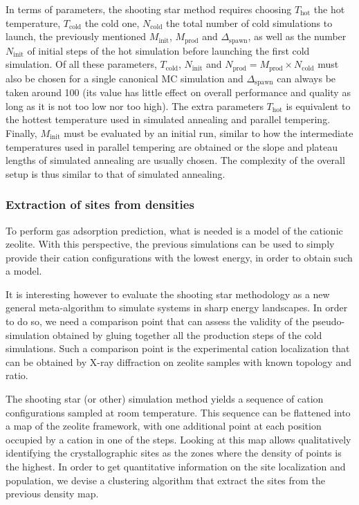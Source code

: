 \documentclass[main.tex]{subfiles}
\begin{document}
In terms of parameters, the shooting star method requires choosing $T_\text{hot}$ the hot temperature, $T_\text{cold}$ the cold one, $N_\text{cold}$ the total number of cold simulations to launch, the previously mentioned $M_\text{init}$, $M_\text{prod}$ and $\Delta_\text{spawn}$, as well as the number $N_\text{init}$ of initial steps of the hot simulation before launching the first cold simulation. Of all these parameters, $T_\text{cold}$, $N_\text{init}$ and $N_\text{prod} = M_\text{prod}\times N_\text{cold}$ must also be chosen for a single canonical MC simulation and $\Delta_\text{spawn}$ can always be taken around 100 (its value has little effect on overall performance and quality as long as it is not too low nor too high). The extra parameters $T_\text{hot}$ is equivalent to the hottest temperature used in simulated annealing and parallel tempering. Finally, $M_\text{init}$ must be evaluated by an initial run, similar to how the intermediate temperatures used in parallel tempering are obtained or the slope and plateau lengths of simulated annealing are usually chosen. The complexity of the overall setup is thus similar to that of simulated annealing.


\subsubsection{Extraction of sites from densities}

To perform gas adsorption prediction, what is needed is a model of the cationic zeolite. With this perspective, the previous simulations can be used to simply provide their cation configurations with the lowest energy, in order to obtain such a model.

It is interesting however to evaluate the shooting star methodology as a new general meta-algorithm to simulate systems in sharp energy landscapes. In order to do so, we need a comparison point that can assess the validity of the pseudo-simulation obtained by gluing together all the production steps of the cold simulations. Such a comparison point is the experimental cation localization that can be obtained by X-ray diffraction on zeolite samples with known topology and \SiAl ratio.

The shooting star (or other) simulation method yields a sequence of cation configurations sampled at room temperature. This sequence can be flattened into a map of the zeolite framework, with one additional point at each position occupied by a cation in one of the steps. Looking at this map allows qualitatively identifying the crystallographic sites as the zones where the density of points is the highest. In order to get quantitative information on the site localization and population, we devise a clustering algorithm that extract the sites from the previous density map.
\end{document}
